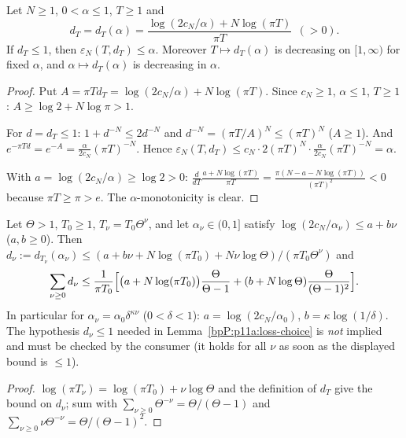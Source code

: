\begin{lemma}\label{bpP:p11a:loss-choice}
Let $N\ge1$, $0<\alpha\le1$, $T\ge1$ and
\[d_T=d_T(\alpha)=\frac{\log(2c_N/\alpha)+N\log(\pi T)}{\pi T}\ \ (>0).\]
If $d_T\le1$, then $\varepsilon_N(T,d_T)\le\alpha$. Moreover $T\mapsto d_T(\alpha)$ is decreasing on $[1,\infty)$ for fixed $\alpha$, and $\alpha\mapsto d_T(\alpha)$ is decreasing in $\alpha$.
\end{lemma}
\begin{proof}
\label{stepP:p11a:lc-exponent} Put $A=\pi Td_T=\log(2c_N/\alpha)+N\log(\pi T)$. Since $c_N\ge1$, $\alpha\le1$, $T\ge1$: $A\ge\log2+N\log\pi>1$.

\label{stepP:p11a:lc-estimate} For $d=d_T\le1$: $1+d^{-N}\le2d^{-N}$ and $d^{-N}=(\pi T/A)^N\le(\pi T)^N$ ($A\ge1$). And $e^{-\pi Td}=e^{-A}=\frac{\alpha}{2c_N}(\pi T)^{-N}$. Hence $\varepsilon_N(T,d_T)\le c_N\cdot2(\pi T)^N\cdot\frac\alpha{2c_N}(\pi T)^{-N}=\alpha$.

\label{stepP:p11a:lc-mono} With $a=\log(2c_N/\alpha)\ge\log2>0$: $\frac d{dT}\frac{a+N\log(\pi T)}{\pi T}=\frac{\pi(N-a-N\log(\pi T))}{(\pi T)^2}<0$ because $\pi T\ge\pi>e$. The $\alpha$-monotonicity is clear.
\end{proof}

\begin{lemma}\label{bpP:p11a:loss-sum}
Let $\Theta>1$, $T_0\ge1$, $T_\nu=T_0\Theta^\nu$, and let $\alpha_\nu\in(0,1]$ satisfy $\log(2c_N/\alpha_\nu)\le a+b\nu$ ($a,b\ge0$). Then $d_\nu:=d_{T_\nu}(\alpha_\nu)\le(a+b\nu+N\log(\pi T_0)+N\nu\log\Theta)/(\pi T_0\Theta^\nu)$ and
\[\sum_{\nu\ge0}d_\nu\le\frac1{\pi T_0}\Bigl[\bigl(a+N\log(\pi T_0)\bigr)\frac\Theta{\Theta-1}+(b+N\log\Theta)\frac\Theta{(\Theta-1)^2}\Bigr].\]
In particular for $\alpha_\nu=\alpha_0\delta^{\kappa\nu}$ ($0<\delta<1$): $a=\log(2c_N/\alpha_0)$, $b=\kappa\log(1/\delta)$. The hypothesis $d_\nu\le1$ needed in Lemma~\ref{bpP:p11a:loss-choice} is \emph{not} implied and must be checked by the consumer (it holds for all $\nu$ as soon as the displayed bound is $\le1$).
\end{lemma}
\begin{proof}
$\log(\pi T_\nu)=\log(\pi T_0)+\nu\log\Theta$ and the definition of $d_T$ give the bound on $d_\nu$; sum with $\sum_{\nu\ge0}\Theta^{-\nu}=\Theta/(\Theta-1)$ and $\sum_{\nu\ge0}\nu\Theta^{-\nu}=\Theta/(\Theta-1)^2$.
\end{proof}

